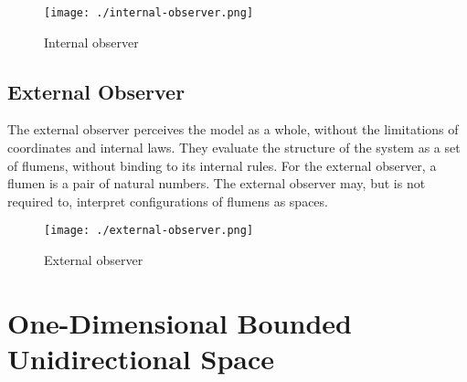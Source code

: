 \documentclass[final]{article}
\begin{document}
            \begin{figure}[H]
                \centering
                \texttt{[image: ./internal-observer.png]}
                \caption{Internal observer}
                \label{fig:image}
            \end{figure}


        \subsection{External Observer}

            The external observer perceives the model as a whole, without the 
            limitations of coordinates and internal laws. They evaluate the 
            structure of the system as a set of flumens, without binding to its 
            internal rules. For the external observer, a flumen is a pair of 
            natural numbers. The external observer may, but is not required to, 
            interpret configurations of flumens as spaces.

            \begin{figure}[H]
                \centering
                \texttt{[image: ./external-observer.png]}
                \caption{External observer}
                \label{fig:image}
            \end{figure}

    \section{One-Dimensional Bounded Unidirectional Space}
\end{document}
